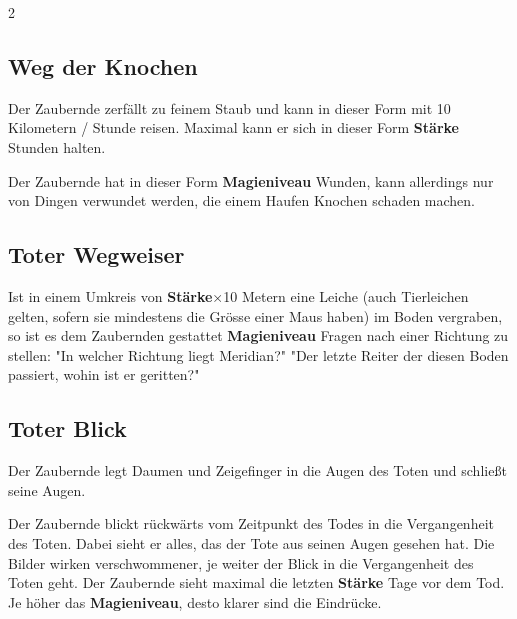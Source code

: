 \begin{multicols*}{2}


\subsection{Weg der Knochen}

Der Zaubernde zerfällt zu feinem Staub und kann in dieser Form mit 10 Kilometern / Stunde reisen. Maximal kann er sich in dieser Form \textbf{Stärke} Stunden halten.

Der Zaubernde hat in dieser Form \textbf{Magieniveau} Wunden, kann allerdings nur von Dingen verwundet werden, die einem Haufen Knochen schaden machen.



\subsection{Toter Wegweiser}

Ist in einem Umkreis von \textbf{Stärke}×10 Metern eine Leiche (auch Tierleichen gelten, sofern sie mindestens die Grösse einer Maus haben) im Boden vergraben, so ist es dem Zaubernden gestattet \textbf{Magieniveau} Fragen nach einer Richtung zu stellen: "In welcher Richtung liegt Meridian?" "Der letzte Reiter der diesen Boden passiert, wohin ist er geritten?"



\subsection{Toter Blick}

Der Zaubernde legt Daumen und Zeigefinger in die Augen des Toten und schließt seine Augen.

Der Zaubernde blickt rückwärts vom Zeitpunkt des Todes in die Vergangenheit des Toten. Dabei sieht er alles, das der Tote aus seinen Augen gesehen hat. Die Bilder wirken verschwommener, je weiter der Blick in die Vergangenheit des Toten geht. Der Zaubernde sieht maximal die letzten \textbf{Stärke} Tage vor dem Tod. Je höher das \textbf{Magieniveau}, desto klarer sind die Eindrücke.




\end{multicols*}

